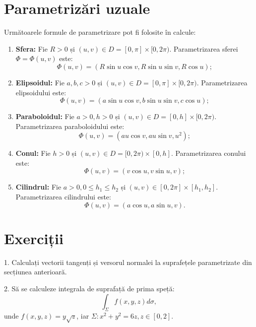 
\section{Parametrizări uzuale}

Următoarele formule de parametrizare pot fi folosite în calcule:
\begin{enumerate}[(1)]
\item \textbf{Sfera:} Fie $ R > 0 $ și $ (u, v) \in D = [0, \pi] \times [0, 2\pi) $.
  Parametrizarea sferei $ \Phi = \Phi(u, v) $ este:
  \[
    \Phi(u, v) = (R \sin u \cos v, R \sin u \sin v, R \cos u);
  \]
\item \textbf{Elipsoidul:} Fie $ a, b, c > 0 $ și
  $ (u, v) \in D = [0, \pi] \times [0, 2\pi) $. Parametrizarea elipsoidului este:
  \[
    \Phi(u, v) = (a \sin u \cos v, b \sin u \sin v, c \cos u);
  \]
\item \textbf{Paraboloidul:} Fie $ a > 0, h > 0 $ și
  $ (u, v) \in D = [0, h] \times [0, 2\pi) $. Parametrizarea paraboloidului este:
  \[
    \Phi(u, v) = (au\cos v, au \sin v, u^2);
  \]
\item \textbf{Conul:} Fie $ h > 0 $ și $ (u, v) \in D = [0, 2\pi) \times [0, h] $.
  Parametrizarea conului este:
  \[
    \Phi(u, v) = (v \cos u, v \sin u, v);
  \]
\item \textbf{Cilindrul:} Fie $ a > 0, 0 \leq h_1 \leq h_2 $ și
  $ (u, v) \in [0, 2\pi] \times [h_1, h_2] $. Parametrizarea cilindrului
  este:
  \[
    \Phi(u, v) = (a \cos u, a \sin u, v).
  \]
\end{enumerate}



\section{Exerciții}

1. Calculați vectorii tangenți și versorul normalei la suprafețele
parametrizate din secțiunea anterioară.

\vspace{1cm}

2. Să se calculeze integrala de suprafață de prima speță:
\[
  \int_\Sigma f(x, y, z) d\sigma,
\]
unde $ f(x, y, z) = y \sqrt{z} $, iar $ \Sigma: x^2 + y^2 = 6z, z \in [0, 2] $.

\vspace{1cm}

